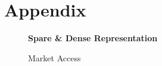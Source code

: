 \documentclass[12pt,letterpaper]{article}
\begin{document}
\section{Appendix}
\begin{figure}[!tbp]
  \begin{subfigure}[b]{0.49\textwidth}
    \label{fig:f1}
  \end{subfigure}
  \hfill
  \begin{subfigure}[b]{0.49\textwidth}
    \label{fig:f2}
  \end{subfigure}
  \caption{\bf Spare \& Dense Representation}
\end{figure}

\begin{figure}
  \centering{
    
  }
  \caption{Market Access}
  \label{fig:f2}
\end{figure}


\end{document}
